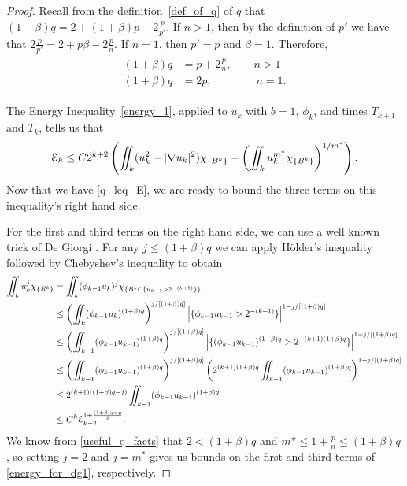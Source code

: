 \begin{proof}
Recall from the definition~\eqref{def_of_q} of $q$ that $(1+\beta)q = 2 + (1+\beta)p - 2\frac{p}{p'}$.  If $n > 1$, then by the definition of $p'$ we have that $2\frac{p}{p'} = 2 + p\beta - 2 \frac{p}{n}$.  
If $n=1$, then $p' = p$ and $\beta = 1$.
Therefore,
\begin{align} \begin{split} \label{useful_q_facts}
(1+\beta)q &= p + 2 \frac{p}{n}, \qquad n > 1 \\
(1+\beta)q &= 2p, \qquad \qquad n = 1.
\end{split} \end{align}


The Energy Inequality~\eqref{energy_1}, applied to $u_k$ with $b=1$, $\phi_k$, and times $T_{k+1}$ and $T_k$, tells us that
\begin{equation} \label{energy_for_dg1} \mathcal{E}_k \leq C 2^{k+2} \left(  \iint_k (u_k^2 + |\nabla u_k|^2) \chi_{\{B^k\}} + \left(  \iint_k u_k^{m^\ast} \chi_{\{B^k\}}  \right)^{1/m^\ast}  \right). \end{equation}
Now that we have \eqref{q_leq_E}, we are ready to bound the three terms on this inequality's right hand side.  

For the first and third terms on the right hand side, we can use a well known trick of De Giorgi \cite{DG}.  For any $j \leq (1+\beta)q$ we can apply H\"{o}lder's inequality followed by Chebyshev's inequality to obtain
\begin{align*}
\iint_k u_k^j \chi_{\{B^k\}} &= \iint_k (\phi_{k-1} u_k)^j \chi_{\{B^k \cap \{u_{k-1} > 2^{-(k+1)}\}\}}
\\ &\leq \left( \iint_k (\phi_{k-1} u_k)^{(1+\beta)q} \right)^{j/[(1+\beta)q]} \left\lvert \{\phi_{k-1} u_{k-1} > 2^{-(k+1)}\} \right\rvert^{1-j/[(1+\beta)q]}
\\ &\leq \left( \iint_{k-1} (\phi_{k-1} u_{k-1})^{(1+\beta)q} \right)^{j/[(1+\beta)q]}\left\lvert \{(\phi_{k-1} u_{k-1})^{(1+\beta)q} > 2^{-(k+1)(1+\beta)q}\} \right\rvert^{1-j/[(1+\beta)q]}
\\ &\leq \left( \iint_{k-1} (\phi_{k-1} u_{k-1})^{(1+\beta)q} \right)^{j/[(1+\beta)q]}\left( 2^{(k+1)(1+\beta)q}\iint_{k-1} (\phi_{k-1}u_{k-1})^{(1+\beta)q} \right)^{1-j/[(1+\beta)q]}
\\ &\leq 2^{(k+1)((1+\beta)q-j)} \iint_{k-1} (\phi_{k-1}u_{k-1})^{(1+\beta)q}
\\ &\leq C^k \mathcal{E}_{k-2}^{1+\frac{(1+\beta)q-p}{2}}.
\end{align*}
We know from \eqref{useful_q_facts} that $2 < (1+\beta)q$ and $m\ast \leq 1 + \frac{p}{n} \leq (1+\beta)q$, so setting $j=2$ and $j = m^\ast$ gives us bounds on the first and third terms of \eqref{energy_for_dg1}, respectively.  


\end{proof}
